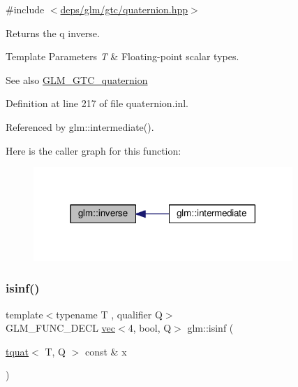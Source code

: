 {\ttfamily \#include $<$\hyperlink{gtc_2quaternion_8hpp}{deps/glm/gtc/quaternion.\+hpp}$>$}

Returns the q inverse.


\begin{DoxyTemplParams}{Template Parameters}
{\em T} & Floating-\/point scalar types.\\
\hline
\end{DoxyTemplParams}
\begin{DoxySeeAlso}{See also}
\hyperlink{group__gtc__quaternion}{G\+L\+M\+\_\+\+G\+T\+C\+\_\+quaternion} 
\end{DoxySeeAlso}


Definition at line 217 of file quaternion.\+inl.



Referenced by glm\+::intermediate().

Here is the caller graph for this function\+:
\nopagebreak
\begin{figure}[H]
\begin{center}
\leavevmode
\includegraphics[width=278pt]{d5/d66/group__gtc__quaternion_gadc59b59ce71daa5586a64a6acf36c072_icgraph}
\end{center}
\end{figure}
\mbox{\label{group__gtc__quaternion_ga139abc0f7f89553e341f8be95bf8d3cb}} 
\subsubsection{\texorpdfstring{isinf()}{isinf()}}
{\footnotesize\ttfamily template$<$typename T , qualifier Q$>$ \\
G\+L\+M\+\_\+\+F\+U\+N\+C\+\_\+\+D\+E\+CL \hyperlink{structglm_1_1vec}{vec}$<$4, bool, Q$>$ glm\+::isinf (\begin{DoxyParamCaption}\item[{\hyperlink{structglm_1_1tquat}{tquat}$<$ T, Q $>$ const \&}]{x }\end{DoxyParamCaption})}



